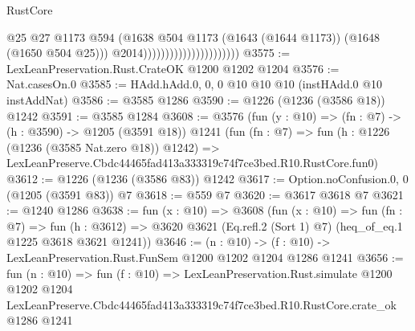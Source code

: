 \begin{lexlean}{RustCore}
\begin{coremodule}
                                                @25
                                                @27
                                                @1173
                                                @594
                                                (@1638
                                                  @504
                                                  @1173
                                                  (@1643 (@1644 @1173))
                                                  (@1648 (@1650 @504 @25)))
                                                @2014))))))))))))))))))))))
@3575 := LexLeanPreservation.Rust.CrateOK @1200 @1202 @1204
@3576 := Nat.casesOn.{0}
@3585 := HAdd.hAdd.{0, 0, 0} @10 @10 @10 (instHAdd.{0} @10 instAddNat)
@3586 := @3585 @1286
@3590 := @1226 (@1236 (@3586 @18)) @1242
@3591 := @3585 @1284
@3608 := @3576
    (fun (y : @10) => (fn : @7) -> (h : @3590) -> @1205 (@3591 @18))
    @1241
    (fun (fn : @7) =>
    fun (h : @1226 (@1236 (@3585 Nat.zero @18)) @1242) =>
    LexLeanPreserve.Cbdc44465fad413a333319c74f7ce3bed.R10.RustCore.fun0)
@3612 := @1226 (@1236 (@3586 @83)) @1242
@3617 := Option.noConfusion.{0, 0} (@1205 (@3591 @83)) @7
@3618 := @559 @7
@3620 := @3617 @3618 @7
@3621 := @1240 @1286
@3638 := fun (x : @10) =>
  @3608
    (fun (x : @10) =>
    fun (fn : @7) =>
    fun (h : @3612) =>
    @3620 @3621 (Eq.refl.{2} (Sort 1) @7) (heq_of_eq.{1} @1225 @3618 @3621 @1241))
@3646 := (n : @10) -> (f : @10) -> LexLeanPreservation.Rust.FunSem @1200 @1202 @1204 @1286 @1241
@3656 := fun (n : @10) =>
  fun (f : @10) =>
  LexLeanPreservation.Rust.simulate
    @1200
    @1202
    @1204
    LexLeanPreserve.Cbdc44465fad413a333319c74f7ce3bed.R10.RustCore.crate_ok
    @1286
    @1241
\end{coremodule}
\end{lexlean}
